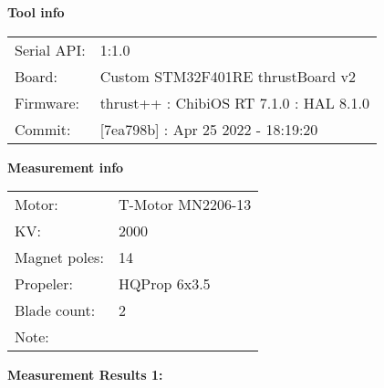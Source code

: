 \documentclass[10pt]{article}
\begin{document}
\noindent
{\large \bf Tool info}
\vspace{3mm}

\noindent
\begin{tabular}{ll}
Serial API:  & 1:1.0\\ 
Board:       & Custom STM32F401RE thrustBoard v2\\ 
Firmware:    & thrust++ : ChibiOS RT 7.1.0 : HAL 8.1.0\\ 
Commit:      & [7ea798b] : Apr 25 2022 - 18:19:20
\end{tabular}
\vspace{3mm}

\noindent
{\large \bf Measurement info}
\vspace{3mm}

\noindent
\begin{tabular}{ll}
Motor:        & T-Motor MN2206-13\\ 
KV:           & 2000\\ 
Magnet poles: & 14\\ 
Propeler:     & HQProp 6x3.5\\ 
Blade count:  & 2\\ 
Note:         & 
\end{tabular}

\vspace{3mm}

\noindent
{\large \bf Measurement Results 1:}
\vspace{3mm}
\end{document}
